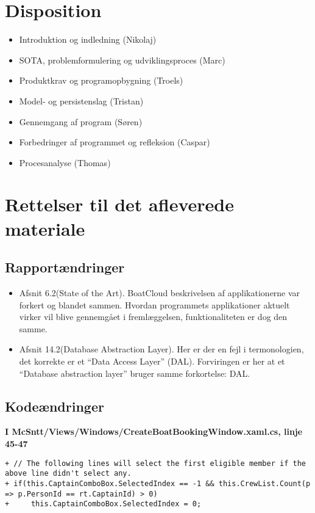 \documentclass[article,a4paper,11pt,onseside,final]{memoir}
\begin{document}
\chapter{Disposition}

	\begin{itemize}
	\item Introduktion og indledning (Nikolaj)
	\item SOTA, problemformulering og udviklingsproces (Marc)
	\item Produktkrav og programopbygning (Troels)
	\item Model- og persistenslag (Tristan)
	\item Gennemgang af program (Søren)
	\item Forbedringer af programmet og refleksion (Caspar)
	\item Procesanalyse	(Thomas)
	\end{itemize}

\newpage
\chapter{Rettelser til det afleverede materiale}

\section{Rapportændringer}
\begin{itemize}
    \item Afsnit 6.2(State of the Art). BoatCloud beskrivelsen af applikationerne var forkert og blandet sammen. Hvordan programmets applikationer aktuelt virker vil blive gennemgået i fremlæggelsen, funktionaliteten er dog den samme.
    \item Afsnit 14.2(Database Abstraction Layer). Her er der en fejl i termonologien, det korrekte er et ``Data Access Layer'' (DAL). Forviringen er her at et ``Database abstraction layer'' bruger samme forkortelse: DAL. 
\end{itemize}

\section{Kodeændringer}

\textbf{I McSntt/Views/Windows/CreateBoatBookingWindow.xaml.cs, linje 45-47}
\lstset{firstnumber=45}
\begin{lstlisting}[frame=single, caption=CreateBoatBookingWindow.cs ændringer, label=fntpg-cb]
+ // The following lines will select the first eligible member if the above line didn't select any.
+ if(this.CaptainComboBox.SelectedIndex == -1 && this.CrewList.Count(p => p.PersonId == rt.CaptainId) > 0) 
+     this.CaptainComboBox.SelectedIndex = 0;
\end{lstlisting}
\end{document}

